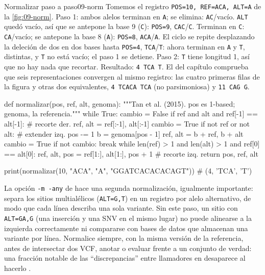 \begin{ejemplo}{Normalizar paso a paso}{09-norm}
Tomemos el registro \texttt{POS=10, REF=ACA, ALT=A} de la \cref{fig:09-norm}. Paso 1: ambos alelos terminan en \texttt{A}; se elimina: \texttt{AC}/vacío. \texttt{ALT} quedó vacío, así que se antepone la base 9 (\texttt{C}): \texttt{POS=9}, \texttt{CAC}/\texttt{C}. Terminan en \texttt{C}: \texttt{CA}/vacío; se antepone la base 8 (\texttt{A}): \texttt{POS=8}, \texttt{ACA}/\texttt{A}. El ciclo se repite desplazando la deleción de dos en dos bases hasta \texttt{POS=4}, \texttt{TCA}/\texttt{T}: ahora terminan en \texttt{A} y \texttt{T}, distintas, y \texttt{T} no está vacío; el paso 1 se detiene. Paso 2: \texttt{T} tiene longitud 1, así que no hay nada que recortar. Resultado: \texttt{4\ TCA\ T}. El  del capítulo comprueba que seis representaciones convergen al mismo registro: las cuatro primeras filas de la figura y otras dos equivalentes, \texttt{4\ TCACA\ TCA} (no parsimoniosa) y \texttt{11\ CAG\ G}.
\end{ejemplo}

\begin{codigo}[normalizar.py]
def normalizar(pos, ref, alt, genoma):
    """Tan et al. (2015). pos es 1-based; genoma, la referencia."""
    while True:
        cambio = False
        if ref and alt and ref[-1] == alt[-1]:   # recorte der.
            ref, alt = ref[:-1], alt[:-1]
            cambio = True
        if not ref or not alt:                   # extender izq.
            pos -= 1
            b = genoma[pos - 1]
            ref, alt = b + ref, b + alt
            cambio = True
        if not cambio:
            break
    while len(ref) > 1 and len(alt) > 1 and ref[0] == alt[0]:
        ref, alt, pos = ref[1:], alt[1:], pos + 1   # recorte izq.
    return pos, ref, alt

print(normalizar(10, "ACA", "A", "GGATCACACACAGT"))   # (4, 'TCA', 'T')
\end{codigo}

La opción \texttt{-m -any} de  hace una segunda normalización, igualmente importante: separa los sitios multialélicos (\texttt{ALT=G,T}) en un registro por alelo alternativo, de modo que cada línea describa una sola variante. Sin este paso, un sitio con \texttt{ALT=GA,G} (una inserción y una SNV en el mismo lugar) no puede alinearse a la izquierda correctamente ni compararse con bases de datos que almacenan una variante por línea. Normalice siempre, con la misma versión de la referencia, antes de intersectar dos VCF, anotar o evaluar frente a un conjunto de verdad: una fracción notable de las ``discrepancias'' entre llamadores en  desaparece al hacerlo \parencite{c09-tan2015}.

